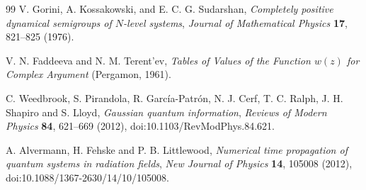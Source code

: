 \documentclass[11pt,a4paper]{article}
\begin{document}
\begin{thebibliography}{99}
V. Gorini, A. Kossakowski, and E. C. G. Sudarshan,
\emph{Completely positive dynamical semigroups of $N$-level systems},
\emph{Journal of Mathematical Physics} \textbf{17}, 821--825 (1976).

V. N. Faddeeva and N. M. Terent'ev,
\emph{Tables of Values of the Function $w(z)$ for Complex Argument}
(Pergamon, 1961).

C. Weedbrook, S. Pirandola, R. Garc\'ia-Patr\'on, N. J. Cerf, T. C. Ralph,
J. H. Shapiro and S. Lloyd, \emph{Gaussian quantum information},
\emph{Reviews of Modern Physics} \textbf{84}, 621--669 (2012),
doi:10.1103/RevModPhys.84.621.

A. Alvermann, H. Fehske and P. B. Littlewood,
\emph{Numerical time propagation of quantum systems in radiation fields},
\emph{New Journal of Physics} \textbf{14}, 105008 (2012),
doi:10.1088/1367-2630/14/10/105008.

\end{thebibliography}
\end{document}
